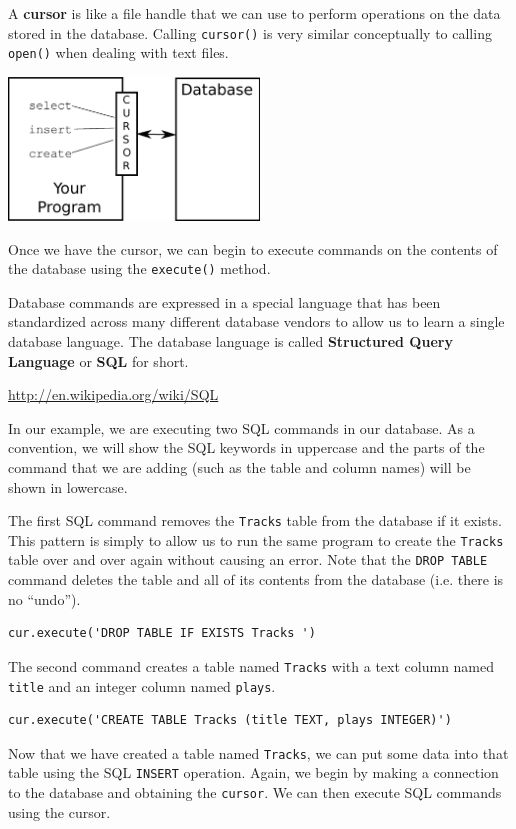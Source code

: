 \documentclass[10pt]{book}
\begin{document}
A {\bf cursor} is like a file handle that we can use to perform
operations on the data stored in the database.  Calling 
{\tt cursor()} is very similar conceptually to calling
{\tt open()} when dealing with text files.

\beforefig
\centerline{\includegraphics[height=1.50in]{figs2/cursor.eps}}
\afterfig

Once we have the cursor, we can begin to execute 
commands on the contents of the database using the {\tt execute()}
method.

Database commands are expressed in a special language that has 
been standardized across many different database vendors 
to allow us to learn a single database language.   The database
language is called {\bf Structured Query Language} or {\bf SQL}
for short.

\url{http://en.wikipedia.org/wiki/SQL}

In our example, we are executing two SQL commands in our database.
As a convention, we will show the SQL keywords in uppercase 
and the parts of the command that we are adding (such as the
table and column names) will be shown in lowercase.

The first SQL command removes the {\tt Tracks} table from the 
database if it exists.  This pattern is simply to allow us to 
run the same program to create the {\tt Tracks} table over 
and over again without causing an error.  Note that the
{\tt DROP TABLE} command deletes the table and all of its contents
from the database (i.e. there is no ``undo'').

\beforeverb
\begin{verbatim}
cur.execute('DROP TABLE IF EXISTS Tracks ')
\end{verbatim}
\afterverb
%
The second command creates a table named
{\tt Tracks} with a text column named {\tt title}
and an integer column named {\tt plays}.

\beforeverb
\begin{verbatim}
cur.execute('CREATE TABLE Tracks (title TEXT, plays INTEGER)')
\end{verbatim}
\afterverb
%
Now that we have created a table named {\tt Tracks}, we can put some data
into that table using the SQL {\tt INSERT} operation.   Again, we begin
by making a connection to the database and obtaining the {\tt cursor}.
We can then execute SQL commands using the cursor.
\end{document}
